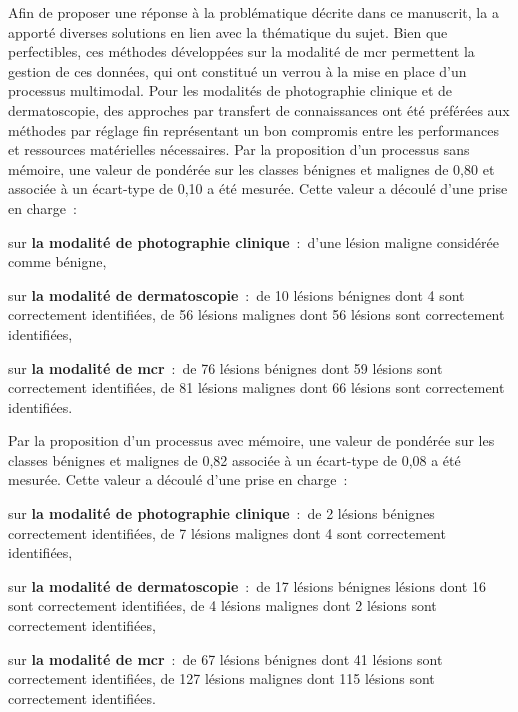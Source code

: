 Afin de proposer une réponse à la problématique décrite dans ce manuscrit, la  a apporté diverses solutions en lien avec la thématique du sujet. Bien que perfectibles, ces méthodes développées sur la modalité de \gls{mcr} permettent la gestion de ces données, qui ont constitué un verrou à la mise en place d'un processus multimodal. Pour les modalités de photographie clinique et de dermatoscopie, des approches par transfert de connaissances ont été préférées aux méthodes par réglage fin représentant un bon compromis entre les performances et ressources matérielles nécessaires. Par la proposition d'un processus sans mémoire, une valeur de \fscore{} pondérée sur les classes bénignes et malignes de 0,80 et associée à un écart-type de 0,10 a été mesurée. Cette valeur a découlé d'une prise en charge~:
\begin{inlinerate}
    \item sur \textbf{la modalité de photographie clinique}~:~d'une lésion maligne considérée comme bénigne,
    \item sur \textbf{la modalité de dermatoscopie}~:~de 10 lésions bénignes dont 4 sont correctement identifiées, de 56 lésions malignes dont 56 lésions sont correctement identifiées,
    \item sur \textbf{la modalité de \gls{mcr}}~:~de 76 lésions bénignes dont 59 lésions sont correctement identifiées, de 81 lésions malignes dont 66 lésions sont correctement identifiées.
\end{inlinerate} Par la proposition d'un processus avec mémoire, une valeur de \fscore{} pondérée sur les classes bénignes et malignes de 0,82 associée à un écart-type de 0,08 a été mesurée. Cette valeur a découlé d'une prise en charge~:
\begin{inlinerate}
    \item sur \textbf{la modalité de photographie clinique}~:~de 2 lésions bénignes correctement identifiées, de 7 lésions malignes dont 4 sont correctement identifiées,
    \item sur \textbf{la modalité de dermatoscopie}~:~de 17 lésions bénignes lésions dont 16 sont correctement identifiées, de 4 lésions malignes dont 2 lésions sont correctement identifiées,
    \item sur \textbf{la modalité de \gls{mcr}}~:~de 67 lésions bénignes dont 41 lésions sont correctement identifiées, de 127 lésions malignes dont 115 lésions sont correctement identifiées.
\end{inlinerate}\par

